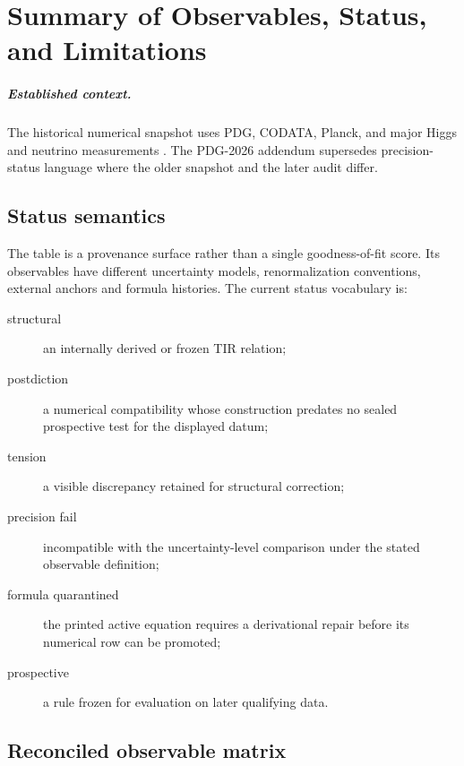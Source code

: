 \chapter{Summary of Observables, Status, and Limitations}
\label{ch:parameter_summary}

\paragraph{Established context.}
The historical numerical snapshot uses PDG, CODATA, Planck, and major Higgs and
neutrino measurements
\cite{PDG2024,CODATA2022,Planck2018,ATLAS2012Higgs,CMS2012Higgs,SuperK1998,SNO2002}.
The PDG-2026 addendum supersedes precision-status language where the older
snapshot and the later audit differ.


\section{Status semantics}
The table is a provenance surface rather than a single goodness-of-fit score.
Its observables have different uncertainty models, renormalization conventions,
external anchors and formula histories.  The current status vocabulary is:

\begin{description}
\item[structural] an internally derived or frozen TIR relation;
\item[postdiction] a numerical compatibility whose construction predates no
sealed prospective test for the displayed datum;
\item[tension] a visible discrepancy retained for structural correction;
\item[precision fail] incompatible with the uncertainty-level comparison under
the stated observable definition;
\item[formula quarantined] the printed active equation requires a derivational
repair before its numerical row can be promoted;
\item[prospective] a rule frozen for evaluation on later qualifying data.
\end{description}

\section{Reconciled observable matrix}

